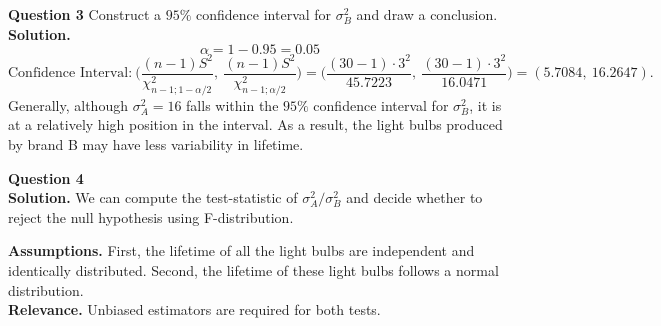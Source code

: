 \documentclass[
]{book}
\begin{document}
\textbf{Question 3} Construct a \(95\%\) confidence interval for \(\sigma_B^2\) and draw a conclusion.\\
\textbf{Solution.} \[\alpha = 1 - 0.95 = 0.05\]
\[\text{Confidence Interval:} \ \bigg(\frac{(n-1)S^2}{\chi_{n-1; 1-\alpha/2}^2}, \ \frac{(n-1)S^2}{\chi_{n-1; \alpha/2}^2}\bigg) = \bigg(\frac{(30-1) \cdot 3^2}{45.7223}, \ \frac{(30-1) \cdot 3^2}{16.0471} \bigg) = (5.7084, \ 16.2647).\]
Generally, although \(\sigma_A^2 = 16\) falls within the \(95\%\) confidence interval for \(\sigma_B^2\), it is at a relatively high position in the interval. As a result, the light bulbs produced by brand B may have less variability in lifetime.

\textbf{Question 4}\\
\textbf{Solution.} We can compute the test-statistic of \(\sigma_A^2 / \sigma_B^2\) and decide whether to reject the null hypothesis using F-distribution.

\textbf{Assumptions.} First, the lifetime of all the light bulbs are independent and identically distributed. Second, the lifetime of these light bulbs follows a normal distribution.\\
\textbf{Relevance.} Unbiased estimators are required for both tests.

  
\end{document}

